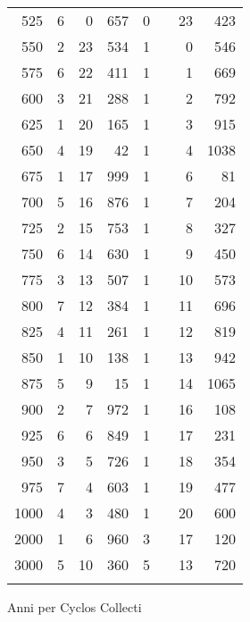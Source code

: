 \begin{tabnums}
\begin{tabular}[c]{@{} r rrr r@{}lrr @{}}
 525 & 6 &  0 &  657 & 0&& 23 &  423 \\
 550 & 2 & 23 &  534 & 1&&  0 &  546 \\
 575 & 6 & 22 &  411 & 1&&  1 &  669 \\
 600 & 3 & 21 &  288 & 1&&  2 &  792 \\
 625 & 1 & 20 &  165 & 1&&  3 &  915 \\
 650 & 4 & 19 &   42 & 1&&  4 & 1038 \\
 675 & 1 & 17 &  999 & 1&&  6 &   81 \\
 700 & 5 & 16 &  876 & 1&&  7 &  204 \\
 725 & 2 & 15 &  753 & 1&&  8 &  327 \\
 750 & 6 & 14 &  630 & 1&&  9 &  450 \\
 775 & 3 & 13 &  507 & 1&& 10 &  573 \\
 800 & 7 & 12 &  384 & 1&& 11 &  696 \\
 825 & 4 & 11 &  261 & 1&& 12 &  819 \\
 850 & 1 & 10 &  138 & 1&& 13 &  942 \\
 875 & 5 &  9 &   15 & 1&& 14 & 1065 \\
 900 & 2 &  7 &  972 & 1&& 16 &  108 \\
 925 & 6 &  6 &  849 & 1&& 17 &  231 \\
 950 & 3 &  5 &  726 & 1&& 18 &  354 \\
 975 & 7 &  4 &  603 & 1&& 19 &  477 \\
1000 & 4 &  3 &  480 & 1&& 20 &  600 \\
2000 & 1 &  6 &  960 & 3&\super{*}
 & 17 &  120 \\
3000 & 5 & 10 &  360 & 5&\super{*}
 & 13 &  720 \\
\bottomrule
\addlinespace[5pt]
\multicolumn{3}{r}{\footnotesize\super{*}In originalis: 1}
\end{tabular}
\caption{Anni per Cyclos Collecti}
\label{tab:p203a}
\end{tabnums}
